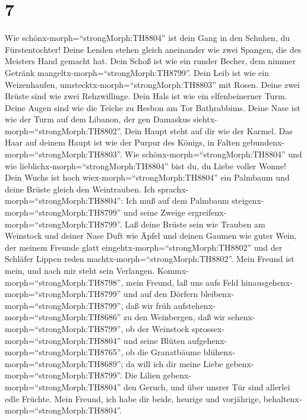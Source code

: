 \hypertarget{section-6}{%
\section{7}\label{section-6}}

 Wie schönx-morph=``strongMorph:TH8804'' ist dein Gang in
den Schuhen, du Fürstentochter! Deine Lenden stehen gleich aneinander
wie zwei Spangen, die des Meisters Hand gemacht hat.  Dein
Schoß ist wie ein runder Becher, dem nimmer Getränk
mangeltx-morph=``strongMorph:TH8799''. Dein Leib ist wie ein
Weizenhaufen, umstecktx-morph=``strongMorph:TH8803'' mit Rosen.
 Deine zwei Brüste sind wie zwei Rehzwillinge. 
Dein Hals ist wie ein elfenbeinerner Turm. Deine Augen sind wie die
Teiche zu Hesbon am Tor Bathrabbims. Deine Nase ist wie der Turm auf dem
Libanon, der gen Damaskus siehtx-morph=``strongMorph:TH8802''.
 Dein Haupt steht auf dir wie der Karmel. Das Haar auf
deinem Haupt ist wie der Purpur des Königs, in Falten
gebundenx-morph=``strongMorph:TH8803''.  Wie
schönx-morph=``strongMorph:TH8804'' und wie
lieblichx-morph=``strongMorph:TH8804'' bist du, du Liebe voller Wonne!
 Dein Wuchs ist hoch wiex-morph=``strongMorph:TH8804'' ein
Palmbaum und deine Brüste gleich den Weintrauben.  Ich
sprachx-morph=``strongMorph:TH8804'': Ich muß auf dem Palmbaum
steigenx-morph=``strongMorph:TH8799'' und seine Zweige
ergreifenx-morph=``strongMorph:TH8799''. Laß deine Brüste sein wie
Trauben am Weinstock und deiner Nase Duft wie Äpfel  und
deinen Gaumen wie guter Wein, der meinem Freunde glatt
eingehtx-morph=``strongMorph:TH8802'' und der Schläfer Lippen reden
machtx-morph=``strongMorph:TH8802''.  Mein Freund ist mein,
und nach mir steht sein Verlangen. 
Kommx-morph=``strongMorph:TH8798'', mein Freund, laß uns aufs Feld
hinausgehenx-morph=``strongMorph:TH8799'' und auf den Dörfern
bleibenx-morph=``strongMorph:TH8799'',  daß wir früh
aufstehenx-morph=``strongMorph:TH8686'' zu den Weinbergen, daß wir
sehenx-morph=``strongMorph:TH8799'', ob der Weinstock
sprossex-morph=``strongMorph:TH8804'' und seine Blüten
aufgehenx-morph=``strongMorph:TH8765'', ob die Granatbäume
blühenx-morph=``strongMorph:TH8689''; da will ich dir meine Liebe
gebenx-morph=``strongMorph:TH8799''.  Die Lilien
gebenx-morph=``strongMorph:TH8804'' den Geruch, und über unsrer Tür sind
allerlei edle Früchte. Mein Freund, ich habe dir beide, heurige und
vorjährige, behaltenx-morph=``strongMorph:TH8804''.

